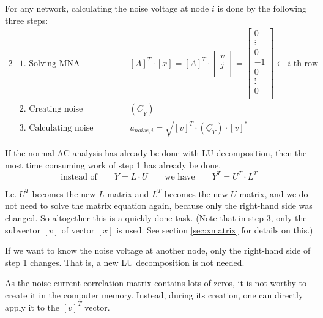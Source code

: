 \addvspace{12pt}

For any network, calculating the noise voltage at node $i$ is done by
the following three steps:
\begin{alignat}{2}
 & \text{1. Solving MNA equation:} & \qquad & \left[A\right]^T \cdot \left[x\right] =
\left[A\right]^T \cdot
\begin{bmatrix}
v \\
j \\
\end{bmatrix}
=
\begin{bmatrix}
0 \\
\vdots \\
0 \\
-1 \\
0 \\
\vdots \\
0 \\
\end{bmatrix}
\leftarrow i\text{-th row} \\
 & \text{2. Creating noise correlation matrix:} & \qquad
 & \left( \underline{C}_Y \right) \\
 & \text{3. Calculating noise voltage:} & \qquad
 & u_{noise,i} = \sqrt{\left[v\right]^T \cdot \left( \underline{C}_Y \right) \cdot \left[v\right]^*}
\end{alignat}

If the normal AC analysis has already be done with LU decomposition,
then the most time consuming work of step 1 has already be done.
\begin{equation}
\text{instead of} \qquad Y = L\cdot U \qquad \text{we have} \qquad
Y^T = U^T \cdot L^T
\end{equation}

I.e. $U^T$ becomes the new $L$ matrix and $L^T$ becomes the new $U$
matrix, and we do not need to solve the matrix equation again, because
only the right-hand side was changed.  So altogether this is a quickly
done task.  (Note that in step 3, only the subvector $[v]$ of vector
$[x]$ is used.  See section \ref{sec:xmatrix} for details on this.)

\addvspace{12pt}

If we want to know the noise voltage at another node, only the
right-hand side of step 1 changes.  That is, a new LU decomposition is
not needed.

\addvspace{12pt}

As the noise current correlation matrix contains lots of zeros, it is
not worthy to create it in the computer memory.  Instead, during its
creation, one can directly apply it to the $\left[v\right]^T$ vector.

